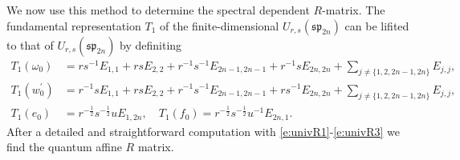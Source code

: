 \documentclass[10pt,a4paper]{amsart}
\numberwithin{equation}{section}
\begin{document}
We now use this method to determine the spectral dependent $R$-matrix. The fundamental representation $T_1$ of the finite-dimensional $U_{r, s}(\mathfrak{s p}_{2 n})$ can be lifited to that of $U_{r, s}(\widehat{\mathfrak{s p}}_{2 n})$ by definiting
\begin{align*}
T_1\left(\omega_0\right)&=r s^{-1} E_{1,1}+r s E_{2,2}+r^{-1} s^{-1} E_{2 n-1,2 n-1}+r^{-1} s E_{2 n, 2 n}+\sum_{j \neq\{1,2,2 n-1,2 n\}} E_{j, j},\\
T_1\left(w_0^{\prime}\right)&=r^{-1} s E_{1,1}+r s E_{2,2}+r^{-1} s^{-1} E_{2 n-1,2 n-1}+r s^{-1} E_{2 n, 2 n}+\sum_{j \neq\{1,2,2 n-1,2 n\}} E_{j, j},\\
T_1\left(e_0\right)&=r^{-\frac{1}{2}} s^{-\frac{1}{2}} u E_{1,2 n}, \quad
T_1\left(f_0\right)=r^{-\frac{1}{2}} s^{-\frac{1}{2}} u^{-1} E_{2 n, 1}.
\end{align*}
 After a detailed and straightforward computation with \eqref{e:univR1}-\eqref{e:univR3} we find the quantum affine $R$ matrix.
\end{document}
